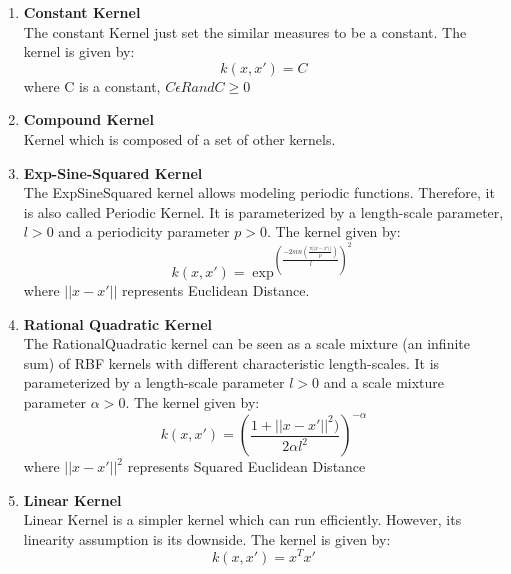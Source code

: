 \documentclass{article}
\begin{document}
\begin{enumerate}
		\item \textbf{Constant Kernel}\\
		The constant Kernel just set the similar measures to be a constant. The kernel is given by:
		\begin{equation}\label{eq:kernel_const}
			k(x,x') = C   
		\end{equation}
		where C is a constant, \(C \epsilon R and C \geq 0\)
		\\

		\item \textbf{Compound Kernel}\\
		Kernel which is composed of a set of other kernels.
		\\

		\item \textbf{Exp-Sine-Squared Kernel}\\
		The ExpSineSquared kernel allows modeling periodic functions. 
		Therefore, it is also called Periodic Kernel.  
		It is parameterized by a length-scale parameter, \(l > 0\) and a periodicity parameter \(p > 0\). 
		The kernel given by:
		\begin{equation}\label{eq:kernel_ess}
			k(x,x') = \exp^{(\frac{-2 sin( \frac{\pi ||x - x'||}{p})}{l})^{2}}   
		\end{equation}
		where \(||x - x'||\) represents Euclidean Distance. \\

		\item \textbf{Rational Quadratic Kernel}\\
		The RationalQuadratic kernel can be seen as a scale mixture (an infinite sum) of RBF kernels with different characteristic length-scales. 
		It is parameterized by a length-scale parameter \(l > 0\) and 
		a scale mixture parameter \( \alpha > 0 \). The kernel given by:
		\begin{equation}\label{eq:kernel_rq}
			k(x,x') = (\frac{1 + ||x - x'||^{2})}{2 \alpha l^{2}})^{-\alpha}
		\end{equation}
		where \(||x-x'||^{2}\) represents Squared Euclidean Distance \\

		\item \textbf{Linear Kernel}\\
		Linear Kernel is a simpler kernel which can run efficiently. However, its linearity assumption is its downside.
		The kernel is given by:
		\begin{equation}\label{eq:kernel_linear}
			k(x,x') = x^{T} x'
		\end{equation}
		\\


\end{enumerate}
\end{document}
